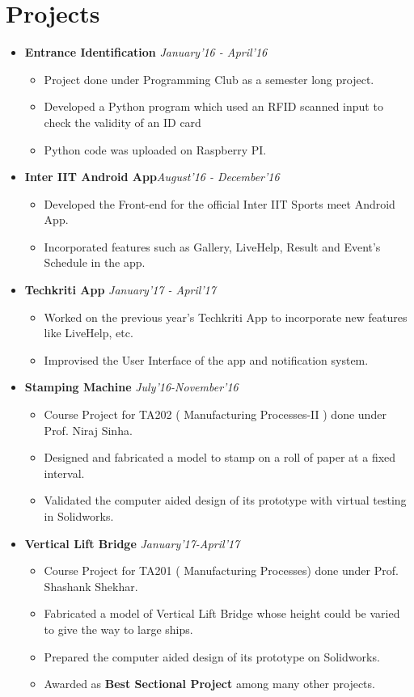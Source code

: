 \documentclass[10pt]{scrbook}
\begin{document}
\section*{Projects}
\begin{itemize}
\item \textbf{Entrance Identification} \hfill\textit{January'16 - April'16}
\begin{itemize}
\item Project done under Programming Club as a semester long project. 
\item Developed a Python program which used an RFID scanned input to check the validity of an ID card
\item Python code was uploaded on Raspberry PI. 

\end{itemize}
\item \textbf{Inter IIT Android App}\hfill\textit{August'16 - December'16}
\begin{itemize}
\item Developed the Front-end for the official Inter IIT Sports meet Android App.
\item Incorporated features such as Gallery, LiveHelp, Result and Event's Schedule in the app. 
\end{itemize}
\item \textbf{Techkriti App} \hfill\textit{January'17 - April'17}
\begin{itemize}
\item Worked on the previous year's Techkriti App to incorporate new features like LiveHelp, etc.
\item Improvised the User Interface of the app and notification system. 
\end{itemize}
\item \textbf{Stamping Machine} \hfill\textit{July'16-November'16}
\begin{itemize}
\item Course Project for TA202 ( Manufacturing Processes-II ) done under Prof. Niraj Sinha.
\item Designed and fabricated a model to stamp on a roll of paper at a fixed interval.
\item Validated the computer aided design of its prototype with virtual testing in Solidworks.
\end{itemize}
\item \textbf{Vertical Lift Bridge} \hfill\textit{January'17-April'17}
\begin{itemize}
\item Course Project for TA201 ( Manufacturing Processes) done under Prof. Shashank Shekhar.
\item Fabricated a model of Vertical Lift Bridge whose height could be varied to give the way to large ships.
\item Prepared the computer aided design of its prototype on Solidworks.
\item Awarded as \textbf{Best Sectional Project} among many other projects. 


\end{itemize}
\end{itemize}
\end{document}
